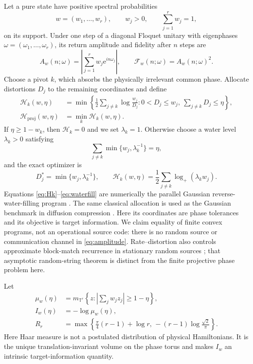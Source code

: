 \documentclass[10pt]{article}
\theoremstyle{definition}
\newcommand{\T}{\mathbb T}
\newcommand{\proj}{\mathrm{proj}}
\newcommand{\Fid}{\mathcal F}
\newcommand{\Hwater}{\mathcal H}
\newcommand{\ee}{\mathrm e}
\begin{document}
Let a pure state have positive spectral probabilities
\[
 w=(w_1,\ldots,w_r),\qquad w_j>0,\qquad \sum_{j=1}^r w_j=1,
\]
on its support.  Under one step of a diagonal Floquet unitary with eigenphases
\(\omega=(\omega_1,\ldots,\omega_r)\), its return amplitude and fidelity after
\(n\) steps are
\begin{equation}
 A_w(n;\omega)=\left|\sum_{j=1}^r w_j\ee^{in\omega_j}\right|,
 \qquad
 \Fid_w(n;\omega)=A_w(n;\omega)^2.
 \label{eq:amplitude}
\end{equation}
Choose a pivot \(k\), which absorbs the physically irrelevant common phase.
Allocate distortions \(D_j\) to the remaining coordinates and define
\begin{align}
 \Hwater_k(w,\eta)
 &=\min\left\{\frac12\sum_{j\ne k}\log\frac{w_j}{D_j}:
       0<D_j\leq w_j,\ \sum_{j\ne k}D_j\leq\eta\right\}, \label{eq:Hk}\\
 \Hwater_{\proj}(w,\eta)&=\min_k\Hwater_k(w,\eta).
 \label{eq:Hproj}
\end{align}
If \(\eta\geq1-w_k\), then \(\Hwater_k=0\) and we set \(\lambda_k=1\).
Otherwise choose a water level \(\lambda_k>0\) satisfying
\begin{equation}
 \sum_{j\ne k}\min\{w_j,\lambda_k^{-1}\}=\eta,
 \label{eq:waterlevel}
\end{equation}
and the exact optimizer is
\begin{equation}
 D_j^*=\min\{w_j,\lambda_k^{-1}\},\qquad
 \Hwater_k(w,\eta)=\frac12\sum_{j\ne k}\log_+(\lambda_k w_j).
 \label{eq:waterfill}
\end{equation}
Equations \eqref{eq:Hk}--\eqref{eq:waterfill} are numerically the parallel
Gaussian reverse-water-filling program \cite{CoverThomas2006,GrayNeuhoff1998}.
The same classical allocation is used as the Gaussian benchmark in diffusion
compression \cite{TheisEtAl2022}.  Here its coordinates are phase tolerances
and its objective is target information.
We claim equality of finite convex programs, not an operational source code:
there is no random source or communication channel in
\eqref{eq:amplitude}.
Rate--distortion also controls approximate block-match recurrence in
stationary random sources \cite{KanayaMuramatsu1997}; that asymptotic
random-string theorem is distinct from the finite projective phase problem
here.

Let
\begin{align}
 \mu_w(\eta)&=m_{\T^r}\left\{z:
  \left|\sum_jw_jz_j\right|\geq1-\eta\right\},\label{eq:target-volume}\\
 I_w(\eta)&=-\log\mu_w(\eta),\label{eq:target-information}\\
 R_r&=\max\left\{\frac{\pi}{4}(r-1)+\log r,\,
  -(r-1)\log\frac{\sqrt2}{\pi}\right\}.\label{eq:remainder}
\end{align}
Here Haar measure is not a postulated distribution of physical
Hamiltonians.  It is the unique translation-invariant volume on the phase
torus and makes \(I_w\) an intrinsic target-information quantity.
\end{document}
